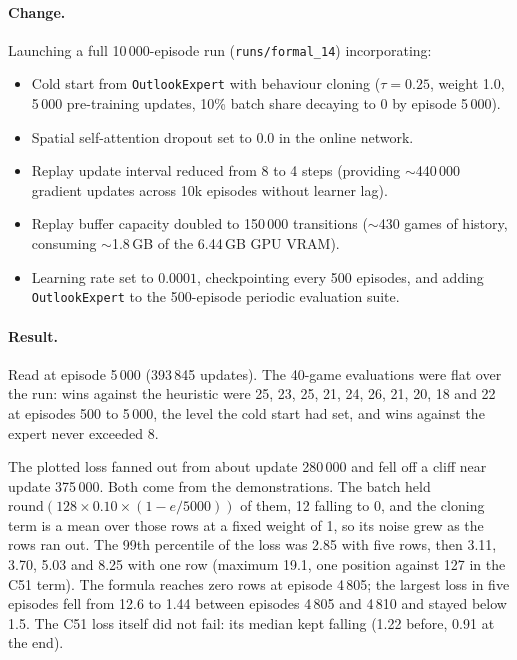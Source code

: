\paragraph{Change.} Launching a full 10\,000-episode run (\texttt{runs/formal\_14}) incorporating:
\begin{itemize}
  \item Cold start from \texttt{OutlookExpert} with behaviour cloning ($\tau = 0.25$, weight 1.0,
        5\,000 pre-training updates, 10\% batch share decaying to 0 by episode 5\,000).
  \item Spatial self-attention dropout set to 0.0 in the online network.
  \item Replay update interval reduced from 8 to 4 steps (providing $\sim$440\,000 gradient updates
        across 10k episodes without learner lag).
  \item Replay buffer capacity doubled to 150\,000 transitions ($\sim$430 games of history,
        consuming $\sim$1.8\,GB of the 6.44\,GB GPU VRAM).
  \item Learning rate set to $0.0001$, checkpointing every 500 episodes, and adding \texttt{OutlookExpert}
        to the 500-episode periodic evaluation suite.
\end{itemize}

\paragraph{Result.} Read at episode 5\,000 (393\,845 updates). The 40-game evaluations were flat over
the run: wins against the heuristic were 25, 23, 25, 21, 24, 26, 21, 20, 18 and 22 at episodes 500 to
5\,000, the level the cold start had set, and wins against the expert never exceeded 8.

The plotted loss fanned out from about update 280\,000 and fell off a cliff near update 375\,000. Both
come from the demonstrations. The batch held $\mathrm{round}(128 \times 0.10 \times (1 - e/5000))$ of
them, 12 falling to 0, and the cloning term is a mean over those rows at a fixed weight of 1, so its
noise grew as the rows ran out. The 99th percentile of the loss was 2.85 with five rows, then 3.11,
3.70, 5.03 and 8.25 with one row (maximum 19.1, one position against 127 in the C51 term). The formula
reaches zero rows at episode 4\,805; the largest loss in five episodes fell from 12.6 to 1.44 between
episodes 4\,805 and 4\,810 and stayed below 1.5. The C51 loss itself did not fail: its median kept
falling (1.22 before, 0.91 at the end).

